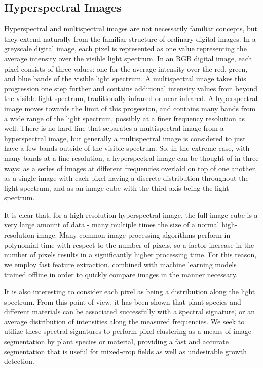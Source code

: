 \subsection{Hyperspectral Images}

Hyperspectral and multispectral images are not necessarily familiar concepts, but they extend naturally from the familiar structure of ordinary digital images.
In a greyscale digital image, each pixel is represented as one value representing the average intensity over the visible light spectrum.
In an RGB digital image, each pixel consists of three values: one for the average intensity over the red, green, and blue bands of the visible light spectrum.
A multispectral image takes this progression one step further and contains additional intensity values from beyond the visible light spectrum, traditionally infrared or near-infrared.
A hyperspectral image moves towards the limit of this progession, and contains many bands from a wide range of the light spectrum, possibly at a finer frequency resolution as well.
There is no hard line that separates a multispectral image from a hyperspectral image, but generally a multispectral image is considered to just have a few bands outside of the visible spectrum.
So, in the extreme case, with many bands at a fine resolution, a hyperspectral image can be thought of in three ways: as a series of images at different frequencies overlaid on top of one another, as a single image with each pixel having a discrete distribution throughout the light spectrum, and as an image cube with the third axis being the light spectrum.

It is clear that, for a high-resolution hyperspectral image, the full image cube is a very large amount of data - many multiple times the size of a normal high-resolution image.
Many common image processing algorithms perform in polynomial time with respect to the number of pixels, so a factor increase in the number of pixels results in a significantly higher processing time.
For this reason, we employ fast feature extraction, combined with machine learning models trained offline in order to quickly compare images in the manner necessary.

It is also interesting to consider each pixel as being a distribution along the light spectrum.
From this point of view, it has been shown that plant species and different materials can be associated successfully with a \"spectral signature\", or an average distribution of intensities along the measured frequencies.
We seek to utilize these spectral signatures to perform pixel clustering as a means of image segmentation by plant species or material, providing a fast and accurate segmentation that is useful for mixed-crop fields as well as undesirable growth detection.


